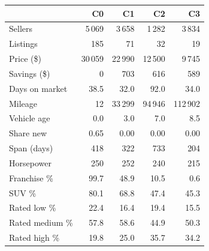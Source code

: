 \begin{tabular}{@{}lrrrr@{}}
\toprule
 & C0 & C1 & C2 & C3 \\
\midrule
Sellers & 5\,069 & 3\,658 & 1\,282 & 3\,834 \\
\midrule
Listings & 185 & 71 & 32 & 19 \\
Price (\$) & 30\,059 & 22\,990 & 12\,500 & 9\,745 \\
Savings (\$) & 0 & 703 & 616 & 589 \\
Days on market & 38.5 & 32.0 & 92.0 & 34.0 \\
Mileage & 12 & 33\,299 & 94\,946 & 112\,902 \\
Vehicle age & 0.0 & 3.0 & 7.0 & 8.5 \\
Share new & 0.65 & 0.00 & 0.00 & 0.00 \\
Span (days) & 418 & 322 & 733 & 204 \\
Horsepower & 250 & 252 & 240 & 215 \\
Franchise \% & 99.7 & 48.9 & 10.5 & 0.6 \\
SUV \% & 80.1 & 68.8 & 47.4 & 45.3 \\
\midrule
Rated low \% & 22.4 & 16.4 & 19.4 & 15.5 \\
Rated medium \% & 57.8 & 58.6 & 44.9 & 50.3 \\
Rated high \% & 19.8 & 25.0 & 35.7 & 34.2 \\
\bottomrule
\end{tabular}
